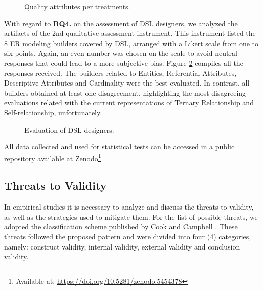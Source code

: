 \begin{figure}[!htb]
    \centering
    
    \caption{Quality attributes per treatments.}
    \label{fig:inst3GERALExp}
\end{figure}

With regard to \textbf{RQ4.} on the assessment of DSL designers, we analyzed the artifacts of the 2nd qualitative assessment instrument.
This instrument listed the 8 ER modeling builders covered by DSL, arranged with a Likert scale from one to six points.
Again, an even number was chosen on the scale to avoid neutral responses that could lead to a more subjective bias.
Figure \ref{fig:inst4GERALExp} compiles all the responses received. 
The builders related to Entities, Referential Attributes, Descriptive Attributes and Cardinality were the best evaluated.
In contrast, all builders obtained at least one disagreement, highlighting the most disagreeing evaluations related with the current representations of Ternary Relationship and Self-relationship, unfortunately.

\begin{figure}[!htb]
    \centering
    
    \caption{Evaluation of DSL designers.}
    \label{fig:inst4GERALExp}
\end{figure}

All data collected and used for statistical tests can be accessed in a public repository available at Zenodo\footnote{Available at: \url{https://doi.org/10.5281/zenodo.5454378}}.

\subsection{Threats to Validity}
\label{ssec_experiments:preliminary_threats}

In empirical studies it is necessary to analyze and discuss the threats to validity, as well as the strategies used to mitigate them.
For the list of possible threats, we adopted the classification scheme published by Cook and Campbell \cite{Cook:1979}. 
These threats followed the proposed pattern and were divided into four (4) categories, namely: construct validity, internal validity, external validity and conclusion validity.


